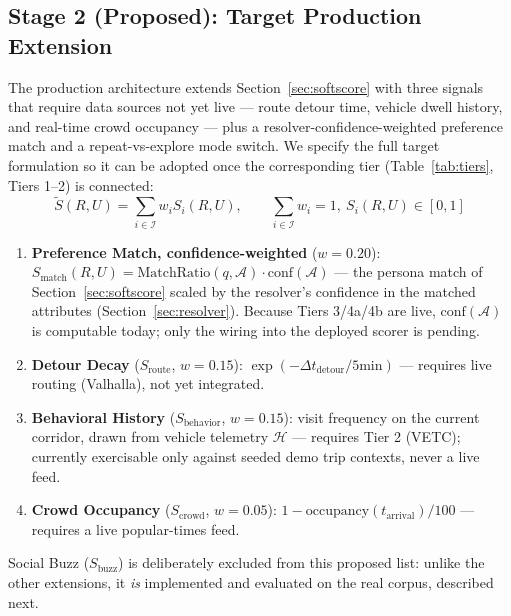 \documentclass[acmsmall,screen]{acmart}
\begin{document}
\subsection{Stage 2 (Proposed): Target Production Extension}
The production architecture extends Section~\ref{sec:softscore} with three signals that require data sources not yet live — route detour time, vehicle dwell history, and real-time crowd occupancy — plus a resolver-confidence-weighted preference match and a repeat-vs-explore mode switch. We specify the full target formulation so it can be adopted once the corresponding tier (Table~\ref{tab:tiers}, Tiers 1--2) is connected:
\begin{equation}
\tilde{S}(R, U) = \sum_{i \in \mathcal{I}} w_i S_i(R, U), \qquad \sum_{i \in \mathcal{I}} w_i = 1,\ S_i(R,U) \in [0,1]
\end{equation}
\begin{enumerate}
    \item \textbf{Preference Match, confidence-weighted} ($w=0.20$): $S_{\text{match}}(R,U) = \text{MatchRatio}(q,\mathcal{A})\cdot\text{conf}(\mathcal{A})$ — the persona match of Section~\ref{sec:softscore} scaled by the resolver's confidence in the matched attributes (Section~\ref{sec:resolver}). Because Tiers 3/4a/4b are live, $\text{conf}(\mathcal{A})$ is computable today; only the wiring into the deployed scorer is pending.
    \item \textbf{Detour Decay} ($S_{\text{route}}$, $w=0.15$): $\exp(-\Delta t_{\text{detour}}/5\text{min})$ — requires live routing (Valhalla), not yet integrated.
    \item \textbf{Behavioral History} ($S_{\text{behavior}}$, $w=0.15$): visit frequency on the current corridor, drawn from vehicle telemetry $\mathcal{H}$ — requires Tier 2 (VETC); currently exercisable only against seeded demo trip contexts, never a live feed.
    \item \textbf{Crowd Occupancy} ($S_{\text{crowd}}$, $w=0.05$): $1-\text{occupancy}(t_{\text{arrival}})/100$ — requires a live popular-times feed.
\end{enumerate}
Social Buzz ($S_{\text{buzz}}$) is deliberately excluded from this proposed list: unlike the other extensions, it \emph{is} implemented and evaluated on the real corpus, described next.
\end{document}
